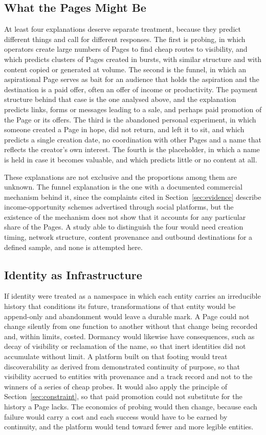 \documentclass[12pt, a4paper]{article}
\begin{document}
\subsection{What the Pages Might Be}

At least four explanations deserve separate treatment, because they predict different things and call for different responses. The first is probing, in which operators create large numbers of Pages to find cheap routes to visibility, and which predicts clusters of Pages created in bursts, with similar structure and with content copied or generated at volume. The second is the funnel, in which an aspirational Page serves as bait for an audience that holds the aspiration and the destination is a paid offer, often an offer of income or productivity. The payment structure behind that case is the one analysed above, and the explanation predicts links, forms or messages leading to a sale, and perhaps paid promotion of the Page or its offers. The third is the abandoned personal experiment, in which someone created a Page in hope, did not return, and left it to sit, and which predicts a single creation date, no coordination with other Pages and a name that reflects the creator's own interest. The fourth is the placeholder, in which a name is held in case it becomes valuable, and which predicts little or no content at all.

These explanations are not exclusive and the proportions among them are unknown. The funnel explanation is the one with a documented commercial mechanism behind it, since the complaints cited in Section~\ref{sec:evidence} describe income-opportunity schemes advertised through social platforms, but the existence of the mechanism does not show that it accounts for any particular share of the Pages. A study able to distinguish the four would need creation timing, network structure, content provenance and outbound destinations for a defined sample, and none is attempted here.

\subsection{Identity as Infrastructure}

If identity were treated as a namespace in which each entity carries an irreducible history that conditions its future, transformations of that entity would be append-only and abandonment would leave a durable mark. A Page could not change silently from one function to another without that change being recorded and, within limits, costed. Dormancy would likewise have consequences, such as decay of visibility or reclamation of the name, so that inert identities did not accumulate without limit. A platform built on that footing would treat discoverability as derived from demonstrated continuity of purpose, so that visibility accrued to entities with provenance and a track record and not to the winners of a series of cheap probes. It would also apply the principle of Section~\ref{sec:constraint}, so that paid promotion could not substitute for the history a Page lacks. The economics of probing would then change, because each failure would carry a cost and each success would have to be earned by continuity, and the platform would tend toward fewer and more legible entities.
\end{document}

